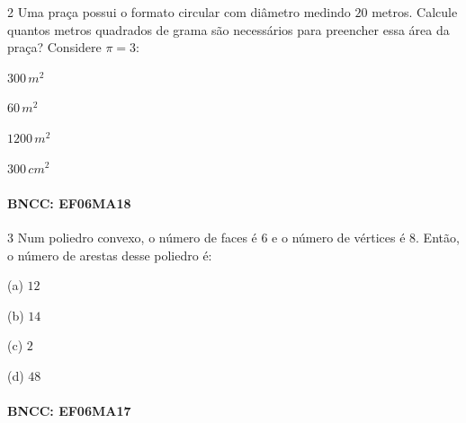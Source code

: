 {\num{2}  Uma praça possui o formato circular com diâmetro medindo $20$ metros.
Calcule quantos metros quadrados de grama são necessários para preencher
essa área da praça? Considere $π = 3$:

\begin{escolha}
\item $300\,m^2$
\item $60\,m^2$
\item $1200\,m^2$
\item $300\,cm^2$
\end{escolha}

\paragraph{BNCC: EF06MA18 }


\num{3}  Num poliedro convexo, o número de faces é $6$ e o número de vértices é
$8$. Então, o número de arestas desse poliedro é:

(a) $12$

(b) $14$

(c) $2$

(d) $48$

\paragraph{BNCC: EF06MA17 }

}
